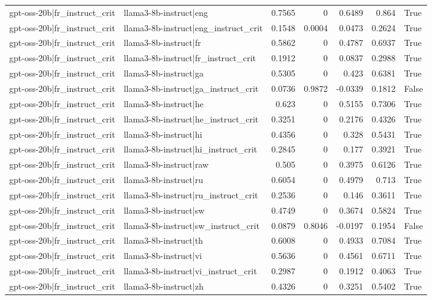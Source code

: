 \begin{table}
\begin{tabular}{l l r r r r l}
gpt-oss-20b|fr_instruct_crit & llama3-8b-instruct|eng & 0.7565 & 0 & 0.6489 & 0.864 & True \\
gpt-oss-20b|fr_instruct_crit & llama3-8b-instruct|eng_instruct_crit & 0.1548 & 0.0004 & 0.0473 & 0.2624 & True \\
gpt-oss-20b|fr_instruct_crit & llama3-8b-instruct|fr & 0.5862 & 0 & 0.4787 & 0.6937 & True \\
gpt-oss-20b|fr_instruct_crit & llama3-8b-instruct|fr_instruct_crit & 0.1912 & 0 & 0.0837 & 0.2988 & True \\
gpt-oss-20b|fr_instruct_crit & llama3-8b-instruct|ga & 0.5305 & 0 & 0.423 & 0.6381 & True \\
gpt-oss-20b|fr_instruct_crit & llama3-8b-instruct|ga_instruct_crit & 0.0736 & 0.9872 & -0.0339 & 0.1812 & False \\
gpt-oss-20b|fr_instruct_crit & llama3-8b-instruct|he & 0.623 & 0 & 0.5155 & 0.7306 & True \\
gpt-oss-20b|fr_instruct_crit & llama3-8b-instruct|he_instruct_crit & 0.3251 & 0 & 0.2176 & 0.4326 & True \\
gpt-oss-20b|fr_instruct_crit & llama3-8b-instruct|hi & 0.4356 & 0 & 0.328 & 0.5431 & True \\
gpt-oss-20b|fr_instruct_crit & llama3-8b-instruct|hi_instruct_crit & 0.2845 & 0 & 0.177 & 0.3921 & True \\
gpt-oss-20b|fr_instruct_crit & llama3-8b-instruct|raw & 0.505 & 0 & 0.3975 & 0.6126 & True \\
gpt-oss-20b|fr_instruct_crit & llama3-8b-instruct|ru & 0.6054 & 0 & 0.4979 & 0.713 & True \\
gpt-oss-20b|fr_instruct_crit & llama3-8b-instruct|ru_instruct_crit & 0.2536 & 0 & 0.146 & 0.3611 & True \\
gpt-oss-20b|fr_instruct_crit & llama3-8b-instruct|sw & 0.4749 & 0 & 0.3674 & 0.5824 & True \\
gpt-oss-20b|fr_instruct_crit & llama3-8b-instruct|sw_instruct_crit & 0.0879 & 0.8046 & -0.0197 & 0.1954 & False \\
gpt-oss-20b|fr_instruct_crit & llama3-8b-instruct|th & 0.6008 & 0 & 0.4933 & 0.7084 & True \\
gpt-oss-20b|fr_instruct_crit & llama3-8b-instruct|vi & 0.5636 & 0 & 0.4561 & 0.6711 & True \\
gpt-oss-20b|fr_instruct_crit & llama3-8b-instruct|vi_instruct_crit & 0.2987 & 0 & 0.1912 & 0.4063 & True \\
gpt-oss-20b|fr_instruct_crit & llama3-8b-instruct|zh & 0.4326 & 0 & 0.3251 & 0.5402 & True \\

\end{tabular}
\end{table}
